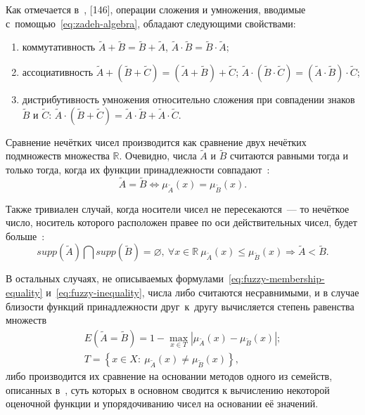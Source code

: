 Как отмечается в~\cite{Pospelov, Borisov_Alexeev_Msk, Yakhyaeva}, [146], операции сложения и умножения, вводимые с~помощью~\eqref{eq:zadeh-algebra}, обладают следующими свойствами:
\begin{enumerate}
	\item коммутативность $\tilde{A}+\tilde{B}=\tilde{B}+\tilde{A}$, $\tilde{A}\cdot \tilde{B}=\tilde{B}\cdot \tilde{A}$;
	\item ассоциативность $\tilde{A}+\left( \tilde{B}+\tilde{C} \right)=\left( \tilde{A}+\tilde{B} \right)+\tilde{C}$; $\tilde{A}\cdot \left( \tilde{B}\cdot \tilde{C} \right)=\left( \tilde{A}\cdot \tilde{B} \right)\cdot \tilde{C}$;
	\item дистрибутивность умножения относительно сложения при совпадении знаков $\tilde{B}$ и $\tilde{C}$: $\tilde{A}\cdot \left( \tilde{B}+\tilde{C} \right)=\tilde{A}\cdot \tilde{B}+\tilde{A}\cdot \tilde{C}$.
\end{enumerate}

Сравнение нечётких чисел производится как сравнение двух нечётких подмножеств множества $\mathbb{R}$. Очевидно, числа $\tilde A$ и $\tilde B$ считаются равными тогда и только тогда, когда их функции принадлежности совпадают~\cite{Ibragimov, Yager_Book}:
\begin{equation}
\label{eq:fuzzy-membership-equality}
  \tilde A = \tilde B \Leftrightarrow \mu_{\tilde A} \left( x \right) = \mu_{\tilde B} \left( x \right).
\end{equation}

Также тривиален случай, когда носители чисел не пересекаются~--- то нечёткое число, носитель которого расположен правее по оси действительных чисел, будет больше~\cite{Ibragimov}:
\begin{equation}
\label{eq:fuzzy-inequality}
  supp \left( \tilde A \right) \bigcap supp \left( \tilde B \right) = \varnothing,\ \forall x \in \mathbb{R}\ \mu_{\tilde A} \left( x \right) \leqslant \mu_{\tilde B} \left( x \right) \Rightarrow \tilde A < \tilde B.
\end{equation}

В остальных случаях, не описываемых формулами~\eqref{eq:fuzzy-membership-equality} и~\eqref{eq:fuzzy-inequality}, числа либо считаются несравнимыми, и в случае близости функций принадлежности друг~к~другу вычисляется степень равенства множеств~\cite{Rutkovskaya, Siler_Buckley, Yager_Book}
\begin{gather*}
  E\left(\tilde A = \tilde B \right)=1 - \underset{x \in T} {\mathop{\max}} \left| \mu_{\tilde A} \left( x \right) - \mu_{\tilde B} \left( x \right) \right|; \\
  T = \left \{ x \in X:\ \mu_{\tilde A} \left( x \right) \neq \mu_{\tilde B} \left( x \right) \right \},
\end{gather*}
либо производится их сравнение на основании методов одного из семейств, описанных в~\cite{Vorontsov_Compare, Cheng_Comparison}, суть которых в основном сводится к вычислению некоторой оценочной функции и упорядочиванию чисел на основании её значений.

